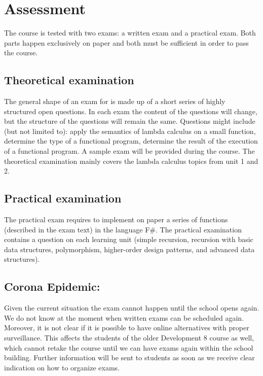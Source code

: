 \section{Assessment}
The course is tested with two exams: a written exam and a practical exam. Both parts happen exclusively on paper and both must be sufficient in order to pass the course.

\subsection{Theoretical examination \modulecode}
The general shape of an exam for \texttt{\modulecode} is made up of a short series of highly structured open questions.
In each exam the content of the questions will change, but the structure of the questions will remain the same. Questions might include (but not limited to): apply the semantics of lambda calculus on a small function, determine the type of a functional program, determine the result of the execution of a functional program. A sample exam will be provided during the course. The theoretical examination mainly covers the lambda calculus topics from unit 1 and 2.

\subsection{Practical examination \modulecode}
The practical exam requires to implement on paper a series of functions (described in the exam text) in the language F\#. The practical examination contains a question on each learning unit (simple recursion, recursion with basic data structures, polymorphism, higher-order design patterns, and advanced data structures).

\subsection{Corona Epidemic:}
Given the current situation the exam cannot happen until the school opens again. We do not know at the moment when written exams can be scheduled again. Moreover, it is not clear if it is possible to have online alternatives with proper surveillance. This affects the students of the older Development 8 course as well, which cannot retake the course until we can have exams again within the school building. Further information will be sent to students as soon as we receive clear indication on how to organize exams.
